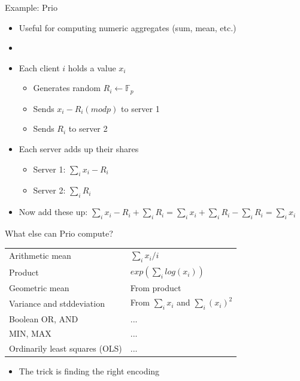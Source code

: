 \documentclass[helvetica]{beamer}
\begin{document}
\begin{frame}{Example: Prio~\cite{201553}}

  \begin{itemize}
  \item Useful for computing numeric aggregates (sum, mean, etc.)
  \item[]
  \item Each client $i$ holds a value $x_i$
    \begin{itemize}
    \item Generates random $R_i \leftarrow \mathbb{F}_p$
    \item Sends $x_i - R_i (mod p)$ to server 1
    \item Sends $R_i$ to server 2
    \end{itemize}

  \item Each server adds up their shares
    \begin{itemize}
    \item Server 1: $\sum_i x_i - R_i$
    \item Server 2: $\sum_i R_i$
    \end{itemize}

  \item Now add these up: $\sum_i x_i - R_i + \sum_i R_i = \sum_i x_i + \sum_i R_i - \sum_i R_i = \sum_i x_i$
  \end{itemize}
\end{frame}


\begin{frame}{What else can Prio compute?}

  \begin{tabular}{l l}
    Arithmetic mean & $\sum_i x_i / i$ \\
    Product & $exp(\sum_i log(x_i))$  \\
    Geometric mean & From product \\
    Variance and stddeviation & From $\sum_i x_i$ and $\sum_i (x_i)^2$ \\
    Boolean OR, AND & ... \\
    MIN, MAX & ... \\
    Ordinarily least squares (OLS) & ... \\
  \end{tabular}

  \vspace{2ex}
  \begin{itemize}
    \item[] The trick is finding the right encoding    
    \end{itemize}
\end{frame}
\end{document}
